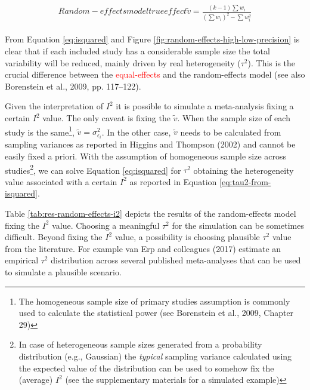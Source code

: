 \documentclass[
  man,floatsintext]{apa6}
\begin{document}
\begin{align}
\begin{gathered}Random-effects model true effect
\tilde{v} = \frac{(k-1) \sum w_i}{(\sum w_i)^2 - \sum w_i^2}
\label{eq:typical-v}
\end{gathered}
\end{align}
\color{black}

From Equation \eqref{eq:isquared} and Figure \ref{fig:random-effects-high-low-precision} is clear that if each included study has a considerable sample size the total variability will be reduced, mainly driven by real heterogeneity (\(\tau^2\)). This is the crucial difference between the \textcolor{red}{equal-effects} and the random-effects model (see also Borenstein et al., 2009, pp. 117--122).

\color{red}

Given the interpretation of \(I^{2}\) it is possible to simulate a meta-analysis fixing a certain \(I^{2}\) value. The only caveat is fixing the \(\tilde{v}\). When the sample size of each study is the same\footnote{The homogeneous sample size of primary studies assumption is commonly used to calculate the statistical power (see Borenstein et al., 2009, Chapter 29)}, \(\tilde{v} = \sigma_{\epsilon_i}^{2}\). In the other case, \(\tilde{v}\) needs to be calculated from sampling variances as reported in Higgins and Thompson (2002) and cannot be easily fixed a priori. With the assumption of homogeneous sample size across studies\footnote{In case of heterogeneous sample sizes generated from a probability distribution (e.g., Gaussian) the \emph{typical} sampling variance calculated using the expected value of the distribution can be used to somehow fix the (average) \(I^2\) (see the supplementary materials for a simulated example)}, we can solve Equation \eqref{eq:isquared} for \(\tau^{2}\) obtaining the heterogeneity value associated with a certain \(I^{2}\) as reported in Equation \eqref{eq:tau2-from-isquared}.
\color{black}

\color{red}

Table \ref{tab:res-random-effects-i2} depicts the results of the random-effects model fixing the \(I^{2}\) value. Choosing a meaningful \(\tau^2\) for the simulation can be sometimes difficult. Beyond fixing the \(I^2\) value, a possibility is choosing plausible \(\tau^2\) value from the literature. For example van Erp and colleagues (2017) estimate an empirical \(\tau^2\) distribution across several published meta-analyses that can be used to simulate a plausible scenario.
\color{black}
\end{document}
